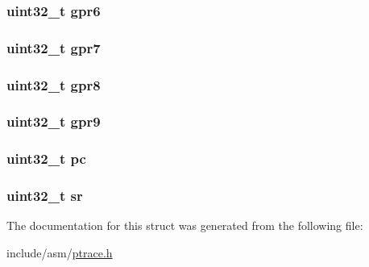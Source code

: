 \hypertarget{structsc__stackframe__t_a0c3b975de7e32dbbf02824683a78a1b9}{
\subsubsection[{gpr6}]{\setlength{\rightskip}{0pt plus 5cm}uint32\-\_\-t {\bf gpr6}}}\label{structsc__stackframe__t_a0c3b975de7e32dbbf02824683a78a1b9}
\hypertarget{structsc__stackframe__t_a3acd73cab61418db4549669e9d976dae}{
\subsubsection[{gpr7}]{\setlength{\rightskip}{0pt plus 5cm}uint32\-\_\-t {\bf gpr7}}}\label{structsc__stackframe__t_a3acd73cab61418db4549669e9d976dae}
\hypertarget{structsc__stackframe__t_a85b77137179baee5d46ffeed85b44a0c}{
\subsubsection[{gpr8}]{\setlength{\rightskip}{0pt plus 5cm}uint32\-\_\-t {\bf gpr8}}}\label{structsc__stackframe__t_a85b77137179baee5d46ffeed85b44a0c}
\hypertarget{structsc__stackframe__t_a3803eca6937c4984b76bb28381a00182}{
\subsubsection[{gpr9}]{\setlength{\rightskip}{0pt plus 5cm}uint32\-\_\-t {\bf gpr9}}}\label{structsc__stackframe__t_a3803eca6937c4984b76bb28381a00182}
\hypertarget{structsc__stackframe__t_afaa20335217fae16f0e22b466017dae1}{
\subsubsection[{pc}]{\setlength{\rightskip}{0pt plus 5cm}uint32\-\_\-t {\bf pc}}}\label{structsc__stackframe__t_afaa20335217fae16f0e22b466017dae1}
\hypertarget{structsc__stackframe__t_ac6099d6faed5c217db5f616128468115}{
\subsubsection[{sr}]{\setlength{\rightskip}{0pt plus 5cm}uint32\-\_\-t {\bf sr}}}\label{structsc__stackframe__t_ac6099d6faed5c217db5f616128468115}


\-The documentation for this struct was generated from the following file\-:\begin{DoxyCompactItemize}
\item 
include/asm/\hyperlink{ptrace_8h}{ptrace.\-h}\end{DoxyCompactItemize}
